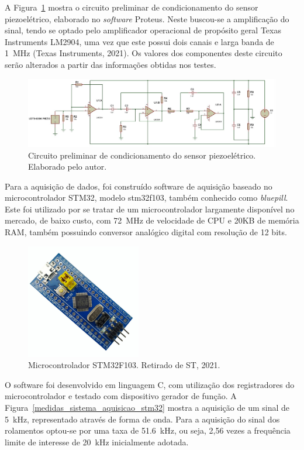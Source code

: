 \documentclass[
	12pt,				
	oneside,			
	a4paper,			
	english,			
	brazil,			
	]{abntex2ppgsi}
\begin{document}
A Figura~\ref{circuito_sensor} mostra o circuito preliminar de condicionamento do sensor piezoelétrico, elaborado no \textit{software} Proteus. Neste buscou-se a amplificação do sinal, tendo se optado pelo amplificador operacional de propósito geral Texas Instruments LM2904, uma vez que este possui dois canais e larga banda de \SI{1}{\mega\hertz} (Texas Instruments, 2021). Os valores dos componentes deste circuito serão alterados a partir das informações obtidas nos testes.

\begin{figure}[H]
\centering
\includegraphics[width=\textwidth,height=\textheight,keepaspectratio]{circuito_sensor}
\caption {Circuito preliminar de condicionamento do sensor piezoelétrico. Elaborado pelo autor.}
\label{circuito_sensor}
\end{figure} 

Para a aquisição de dados, foi construído software de aquisição baseado no microcontrolador STM32, modelo stm32f103, também conhecido como \textit{bluepill}. Este foi utilizado por se tratar de um microcontrolador largamente disponível no mercado, de baixo custo, com \SI{72}{\mega\hertz} de velocidade de CPU e 20KB de memória RAM, também possuindo conversor analógico digital com resolução de 12 bits. 

\begin{figure}[H]
\centering
\includegraphics[width=\textwidth,height=50mm,keepaspectratio]{stm32}
\caption {Microcontrolador STM32F103. Retirado de ST, 2021.}
\label{stm32}
\end{figure}

O software foi desenvolvido em linguagem C, com utilização dos registradores do microcontrolador e testado com dispositivo gerador de função. A Figura~\ref{medidas_sistema_aquisicao_stm32} mostra a aquisição de um sinal de \SI{5}{\kilo\hertz}, representado através de forma de onda. Para a aquisição do sinal dos rolamentos optou-se por uma taxa de \SI{51,6}{\kilo\hertz}, ou seja, 2,56 vezes a frequência limite de interesse de \SI{20}{\kilo\hertz} inicialmente adotada. 
\end{document}
